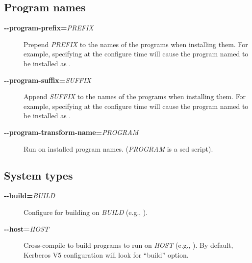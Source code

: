 \documentclass[letterpaper,10pt,english]{sphinxmanual}
\begin{document}
\subsection{Program names}
\label{build/options2configure:program-names}\begin{description}
\item[{\textbf{-}\textbf{-program-prefix=}\emph{PREFIX}}] \leavevmode
Prepend \emph{PREFIX} to the names of the programs when installing
them. For example, specifying  at the
configure time will cause the program named  to be
installed as .

\item[{\textbf{-}\textbf{-program-suffix=}\emph{SUFFIX}}] \leavevmode
Append \emph{SUFFIX} to the names of the programs when installing them.
For example, specifying  at the configure
time will cause the program named  to be installed as
.

\item[{\textbf{-}\textbf{-program-transform-name=}\emph{PROGRAM}}] \leavevmode
Run  on installed program names. (\emph{PROGRAM} is a
sed script).

\end{description}


\subsection{System types}
\label{build/options2configure:system-types}\begin{description}
\item[{\textbf{-}\textbf{-build=}\emph{BUILD}}] \leavevmode
Configure for building on \emph{BUILD}
(e.g., ).

\item[{\textbf{-}\textbf{-host=}\emph{HOST}}] \leavevmode
Cross-compile to build programs to run on \emph{HOST}
(e.g., ).  By default, Kerberos V5
configuration will look for ``build'' option.

\end{description}
\end{document}
